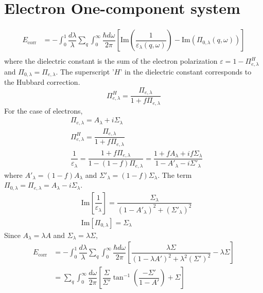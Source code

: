 \documentclass[aps,prb,onecolumn,notitlepage,showpacs,floatfix,superscriptaddress]{revtex4-1}
\begin{document}
\section{Electron One-component system}
\begin{equation}
\begin{split}
E_{\mathrm{corr}}&=-\int_0^1\dfrac{d\lambda}{\lambda} \sum_{q} \int_{0}^{\infty} \dfrac{\hbar d\omega}{2\pi} \left[\mathrm{Im}\left( \dfrac{1}{\varepsilon_{\lambda}(q,\omega)} \right)- \mathrm{Im}\left(\Pi_{0,\lambda}(q,\omega) \right) \right] \\
\end{split}
\end{equation}
where the dielectric constant is the sum of the electron polarization $\varepsilon=1-\Pi_{e,\lambda}^H $ and $\Pi_{0,\lambda}=\Pi_{e,\lambda}$. The superscript '$H$' in the dielectric constant corresponds to the Hubbard correction.
\begin{equation}
\Pi_{e,\lambda}^H = \dfrac{\Pi_{e,\lambda}}{1+f \Pi_{e,\lambda}}
\end{equation}
For the case of electrons, 
\begin{equation}
\begin{split}
&\Pi_{e,\lambda}=A_{\lambda}+i \Sigma_{\lambda} \\
& \Pi_{e,\lambda}^H = \dfrac{\Pi_{e,\lambda}}{1+f \Pi_{e,\lambda}} \\
& \dfrac{1}{\varepsilon_{\lambda}} = \dfrac{1+f \Pi_{e,\lambda}}{1-(1-f)\Pi_{e,\lambda}} = \dfrac{1+f A_{\lambda}+i f \Sigma_{\lambda}}{1- A'_{\lambda}-i \Sigma'_{\lambda}}
\end{split}
\end{equation}
where $A'_{\lambda}=(1-f)A_{\lambda}$ and $\Sigma'_{\lambda}=(1-f)\Sigma_{\lambda}$. The term $\Pi_{0,\lambda}=\Pi_{e,\lambda}= A_{\lambda}-i \Sigma_{\lambda}$.
\begin{equation}
\begin{split}
& \mathrm{Im}\left[\dfrac{1}{\varepsilon_{\lambda}} \right] = \dfrac{\Sigma_{\lambda}}{(1-A'_{\lambda})^2+(\Sigma'_{\lambda})^2} \\
& \mathrm{Im}\left[\Pi_{0,\lambda} \right] = \Sigma_{\lambda}
\end{split}
\end{equation}
Since $A_{\lambda}=\lambda A$ and $\Sigma_{\lambda}=\lambda \Sigma$,
\begin{equation}
\begin{split}
E_{\mathrm{corr}}&=-\int_0^1\dfrac{d\lambda}{\lambda} \sum_{q} \int_{0}^{\infty} \dfrac{\hbar d\omega}{2\pi} \left[ \dfrac{\lambda \Sigma}{(1-\lambda A')^2+\lambda^2 (\Sigma')^2} - \lambda \Sigma \right] \\
&=\sum_{q} \int_{0}^{\infty} \dfrac{d\omega}{2\pi} \left[ \dfrac{\Sigma}{\Sigma'} \tan^{-1} \left(\dfrac{-\Sigma'}{1-A'} \right)+  \Sigma \right] 
\end{split}
\end{equation}
\end{document}
